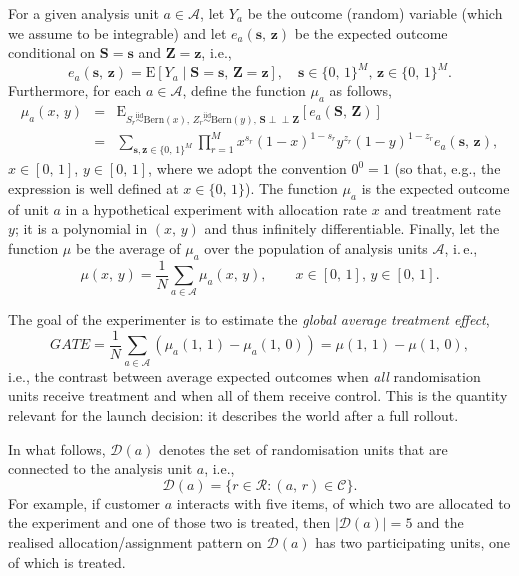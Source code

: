 \documentclass[sigconf]{acmart}
\newcommand{\E}{\mathrm E}
\newcommand{\iidsim}{{\stackrel{\mathrm{iid}}{\sim}}}
\newcommand{\ind}{\perp\!\!\!\perp}
\begin{document}
For a given analysis unit $a\in\mathcal A$, let $Y_a$ be the outcome (random) variable (which we assume to be integrable) and let $e_a(\mathbf{s},\,\mathbf{z})$
be the expected outcome conditional on $\mathbf S = \mathbf s$ and $\mathbf Z = \mathbf z$, i.e.,
\begin{equation}\label{eq:ea}
    e_a(\mathbf{s},\,\mathbf{z}) = \E[Y_a\mid \mathbf{S} = \mathbf{s},\,\mathbf{Z}=\mathbf{z}],\quad \mathbf{s}\in \{0,\,1\}^M,\, \mathbf{z}\in \{0,\,1\}^M.
\end{equation}
Furthermore, for each $a\in\mathcal{A}$, define the function $\mu_a$ as follows,
\begin{eqnarray}\label{eq:ma}
    \mu_a(x,\,y) &=& \E_{S_r\iidsim \mathrm{Bern}(x),\,Z_r\iidsim \mathrm{Bern}(y),\,\mathbf S\ind \mathbf Z}[e_a(\mathbf S,\,\mathbf Z)]\nonumber\\
    &=& \sum_{\textbf{s},\textbf{z}\in \{0,\,1\}^M}\prod_{r=1}^Mx^{s_r}(1-x)^{1-s_r}y^{z_r}(1-y)^{1-z_r}e_a(\textbf{s},\,\textbf{z}),
\end{eqnarray}
$x\in[0,\,1]$, $y\in[0,\,1]$, where we adopt the convention $0^0=1$ (so that, e.g., the expression is well defined at $x\in\{0,\,1\}$). The function $\mu_a$ is the expected outcome of unit $a$ in a hypothetical experiment with allocation rate $x$ and treatment rate $y$; it is a polynomial in $(x,\,y)$ and thus infinitely differentiable. Finally, let the function $\mu$ be the average of $\mu_a$ over the population of analysis units $\mathcal{A}$, i.\,e.,
\begin{equation}\label{eq:mu}
    \mu(x,\,y) = \frac 1 N \sum_{a\in\mathcal{A}} \mu_a(x,\,y),\qquad x\in[0,\,1],\, y\in[0,\,1].
\end{equation}

The goal of the experimenter is to estimate the \emph{global average treatment effect},
\begin{equation}\label{eq:gate}
    GATE = \frac 1 N\sum_{a\in\mathcal A} \left(\mu_a(1,\,1) - \mu_a(1,\,0)\right) = \mu(1,\,1) - \mu(1,\,0),
\end{equation}
i.e., the contrast between average expected outcomes when \emph{all} randomisation units receive treatment and when all of them receive control. This is the quantity relevant for the launch decision: it describes the world after a full rollout.

In what follows, $\mathcal D(a)$ denotes the set of randomisation units that are connected to the analysis unit $a$, i.e.,
\begin{equation*}
    \mathcal{D}(a) = \{r\in\mathcal{R}\colon (a,\,r)\in \mathcal{C}\}.
\end{equation*}
For example, if customer $a$ interacts with five items, of which two are allocated to the experiment and one of those two is treated, then $|\mathcal D(a)|=5$ and the realised allocation/assignment pattern on $\mathcal D(a)$ has two participating units, one of which is treated.
\end{document}
